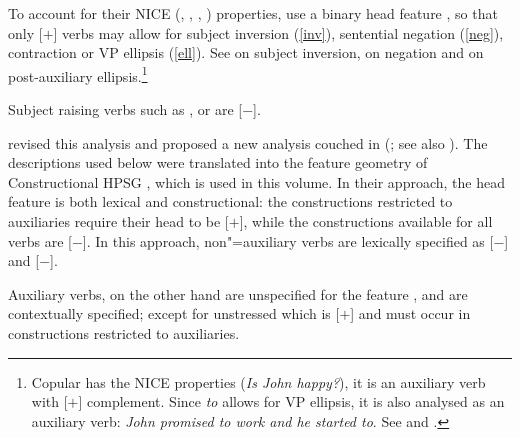 To account for their NICE (, , , ) properties, \citet{KS2002a} %
use a binary head feature \aux, so that only [\aux $+$] verbs may allow for subject inversion
(\ref{inv}), sentential negation (\ref{neg}), contraction or VP ellipsis (\ref{ell}). See
 on subject inversion,
 on negation and
 on post-auxiliary ellipsis.\footnote{Copular  has
  the NICE properties (\textit{Is John happy?}), it is an auxiliary verb with [\prd $+$]
  complement. Since \emph{to} allows for VP ellipsis, it is also analysed as an auxiliary verb:
  \emph{John promised to work and he started to}. See  and .} 

\eal
{}
\zl

\noindent
Subject raising verbs such as ,  or  are [\aux $-$].

\citet{Sagetal2020} revised this analysis and proposed a new analysis couched in \sbcg (\citealp{Sag2012a}; see also ). The descriptions used below were translated into the feature geometry of Constructional HPSG \citep{Sag97a}, which is used in this volume. In their approach, the head feature \aux is both lexical and constructional: the constructions restricted to auxiliaries require their head to be [\aux $+$], while the constructions available for all verbs are [\aux $-$]. In this approach, non"=auxiliary verbs are lexically specified as [\aux $-$] and [\inv $-$].


 Auxiliary verbs, on the other hand are unspecified for the feature \aux, and are contextually specified; except for unstressed   which is [\aux $+$] and must occur in constructions restricted to auxiliaries.

